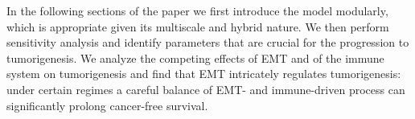 \documentclass{article}
\begin{document}
In the following sections of the paper we first introduce the model modularly, which is appropriate given its multiscale and hybrid nature.
We then perform sensitivity analysis and identify parameters that are crucial for the progression to tumorigenesis.
We analyze the competing effects of EMT and of the immune system on tumorigenesis and find that EMT intricately regulates tumorigenesis: under certain regimes a careful balance of EMT- and immune-driven process can significantly prolong cancer-free survival.



%

\end{document}
